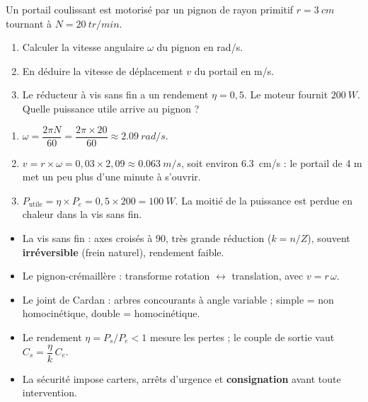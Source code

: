 \documentclass[11pt]{article}
\newcommand{\cle}[1]{{\popxbold\color{popdark}#1}}
\begin{document}
\begin{exercice}
Un portail coulissant est motorisé par un pignon de rayon primitif $r = \SI{3}{cm}$ tournant à $N = \SI{20}{tr/min}$.
\begin{enumerate}
\item Calculer la vitesse angulaire $\omega$ du pignon en rad/s.
\item En déduire la vitesse de déplacement $v$ du portail en m/s.
\item Le réducteur à vis sans fin a un rendement $\eta = 0{,}5$. Le moteur fournit $\SI{200}{W}$. Quelle puissance utile arrive au pignon ?
\end{enumerate}
\end{exercice}

\begin{corrige}[Exercice]
\begin{enumerate}
\item $\omega = \dfrac{2\pi N}{60} = \dfrac{2\pi \times 20}{60} \approx \SI{2,09}{rad/s}$.
\item $v = r \times \omega = 0{,}03 \times 2{,}09 \approx \SI{0,063}{m/s}$, soit environ \SI{6,3}{cm/s} : le portail de 4 m met un peu plus d'une minute à s'ouvrir.
\item $P_{\text{utile}} = \eta \times P_e = 0{,}5 \times 200 = \SI{100}{W}$. La moitié de la puissance est perdue en chaleur dans la vis sans fin.
\end{enumerate}
\end{corrige}

\begin{aretenir}
\begin{itemize}
\item La \cle{vis sans fin} : axes croisés à 90\textdegree, très grande réduction ($k = n/Z$), souvent \textbf{irréversible} (frein naturel), rendement faible.
\item Le \cle{pignon-crémaillère} : transforme rotation $\leftrightarrow$ translation, avec $v = r\,\omega$.
\item Le \cle{joint de Cardan} : arbres concourants à angle variable ; simple = non homocinétique, double = homocinétique.
\item Le \cle{rendement} $\eta = P_s/P_e < 1$ mesure les pertes ; le couple de sortie vaut $C_s = \dfrac{\eta}{k}\,C_e$.
\item La \cle{sécurité} impose carters, arrêts d'urgence et \textbf{consignation} avant toute intervention.
\end{itemize}
\end{aretenir}
\end{document}
